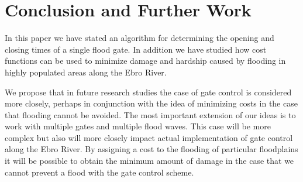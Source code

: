 
\section{Conclusion and Further Work} %

In this paper we have stated an algorithm for determining the opening and closing times of a single flood gate.  In addition we have studied how cost functions can be used to minimize damage and hardship caused by flooding in highly populated areas along the Ebro River.

We propose that in future research studies the case of gate control is considered more closely, perhaps in conjunction with the idea of minimizing costs in the case that flooding cannot be avoided.  The most important extension of our ideas is to work with multiple gates and multiple flood waves.  This case will be more complex but also will more closely impact actual implementation of gate control along the Ebro River.  By assigning a cost to the flooding of particular floodplains it will be possible to obtain the minimum amount of damage in the case that we cannot prevent a flood with the gate control scheme.  
